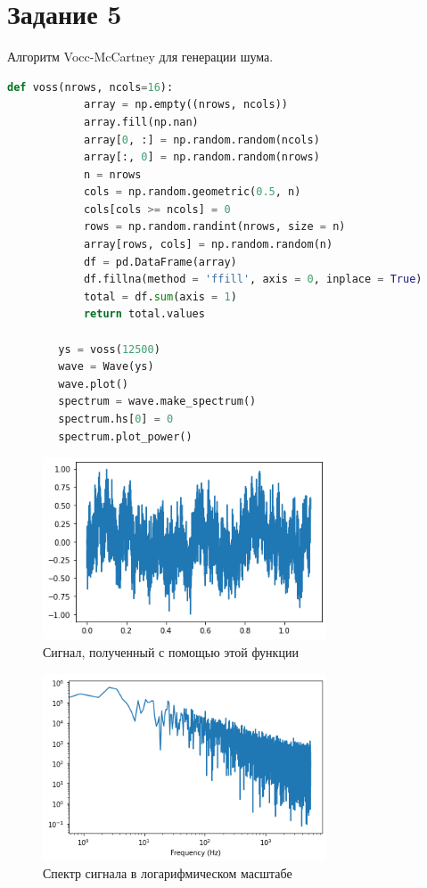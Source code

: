 \documentclass[a4paper, 12pt]{report}
\begin{document}
	\section{Задание 5}
	Алгоритм Vocc-McCartney для генерации  шума.
	\begin{lstlisting}[language=Python,caption=Итоговая функция]
		def voss(nrows, ncols=16):
			array = np.empty((nrows, ncols))
			array.fill(np.nan)
			array[0, :] = np.random.random(ncols)
			array[:, 0] = np.random.random(nrows)
			n = nrows
			cols = np.random.geometric(0.5, n)
			cols[cols >= ncols] = 0
			rows = np.random.randint(nrows, size = n)
			array[rows, cols] = np.random.random(n)
			df = pd.DataFrame(array)
			df.fillna(method = 'ffill', axis = 0, inplace = True)
			total = df.sum(axis = 1)
			return total.values

		ys = voss(12500)
		wave = Wave(ys)
		wave.plot()
		spectrum = wave.make_spectrum()
		spectrum.hs[0] = 0
		spectrum.plot_power()
	\end{lstlisting}
	\begin{figure}[H]
		\centering
		\includegraphics[width=0.75\textwidth]{test7.png}
		\caption{Сигнал, полученный с помощью этой функции}
		\label{fig:test7}
	\end{figure}
	\begin{figure}[H]
		\centering
		\includegraphics[width=0.75\textwidth]{test8.png}
		\caption{Спектр сигнала в логарифмическом масштабе}
		\label{fig:test8}
	\end{figure}
\end{document}
